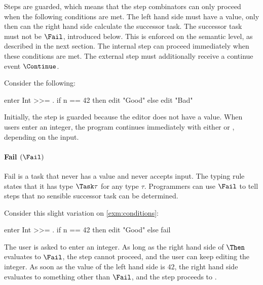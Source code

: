 Steps are guarded, which means that the step combinators can only proceed when the following conditions are met.
The left hand side must have a value, only then can the right hand side calculate the successor task.
The successor task must not be $\Fail$, introduced below.
This is enforced on the semantic level, as described in the next section.
The internal step can proceed immediately when these conditions are met.
The external step must additionally receive a continue event $\Continue$.


\begin{example}
\label{exm:conditions}

Consider the following:
\begin{TASK}
  enter Int >>= \n. if n == 42 then edit "Good" else edit "Bad"
\end{TASK}
Initially, the step is guarded because the editor does not have a value.
When users enter an integer, the program continues immediately with either  or , depending on the input.

\end{example}




\paragraph{Fail $(\Fail)$}
\label{sub:fail}

Fail is a task that never has a value and never accepts input.
The typing rule  states that it has type $\Task \tau$ for any type $\tau$.
Programmers can use $\Fail$ to tell steps that no sensible successor task can be determined.

\begin{example}

Consider this slight variation on \cref{exm:conditions}:
\begin{TASK}
  enter Int >>= \n. if n == 42 then edit "Good" else fail
\end{TASK}
The user is asked to enter an integer.
As long as the right hand side of $\Then$ evaluates to $\Fail$, the step cannot proceed, and the user can keep editing the integer.
As soon as the value of the left hand side is $42$, the right hand side evaluates to something other than $\Fail$, and the step proceeds to .

\end{example}



